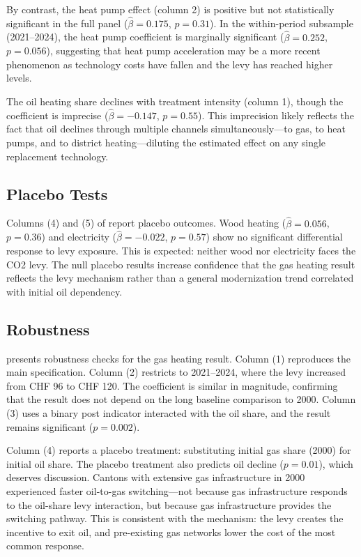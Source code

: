 \documentclass[12pt]{article}
\begin{document}
By contrast, the heat pump effect (column 2) is positive but not statistically significant in the full panel ($\hat{\beta} = 0.175$, $p = 0.31$). In the within-period subsample (2021--2024), the heat pump coefficient is marginally significant ($\hat{\beta} = 0.252$, $p = 0.056$), suggesting that heat pump acceleration may be a more recent phenomenon as technology costs have fallen and the levy has reached higher levels.

The oil heating share declines with treatment intensity (column 1), though the coefficient is imprecise ($\hat{\beta} = -0.147$, $p = 0.55$). This imprecision likely reflects the fact that oil declines through multiple channels simultaneously---to gas, to heat pumps, and to district heating---diluting the estimated effect on any single replacement technology.



\subsection{Placebo Tests}

Columns (4) and (5) of  report placebo outcomes. Wood heating ($\hat{\beta} = 0.056$, $p = 0.36$) and electricity ($\hat{\beta} = -0.022$, $p = 0.57$) show no significant differential response to levy exposure. This is expected: neither wood nor electricity faces the CO2 levy. The null placebo results increase confidence that the gas heating result reflects the levy mechanism rather than a general modernization trend correlated with initial oil dependency.

\subsection{Robustness}

 presents robustness checks for the gas heating result. Column (1) reproduces the main specification. Column (2) restricts to 2021--2024, where the levy increased from CHF 96 to CHF 120. The coefficient is similar in magnitude, confirming that the result does not depend on the long baseline comparison to 2000. Column (3) uses a binary post indicator interacted with the oil share, and the result remains significant ($p = 0.002$).

Column (4) reports a placebo treatment: substituting initial gas share (2000) for initial oil share. The placebo treatment also predicts oil decline ($p = 0.01$), which deserves discussion. Cantons with extensive gas infrastructure in 2000 experienced faster oil-to-gas switching---not because gas infrastructure responds to the oil-share levy interaction, but because gas infrastructure provides the switching pathway. This is consistent with the mechanism: the levy creates the incentive to exit oil, and pre-existing gas networks lower the cost of the most common response.
\end{document}
